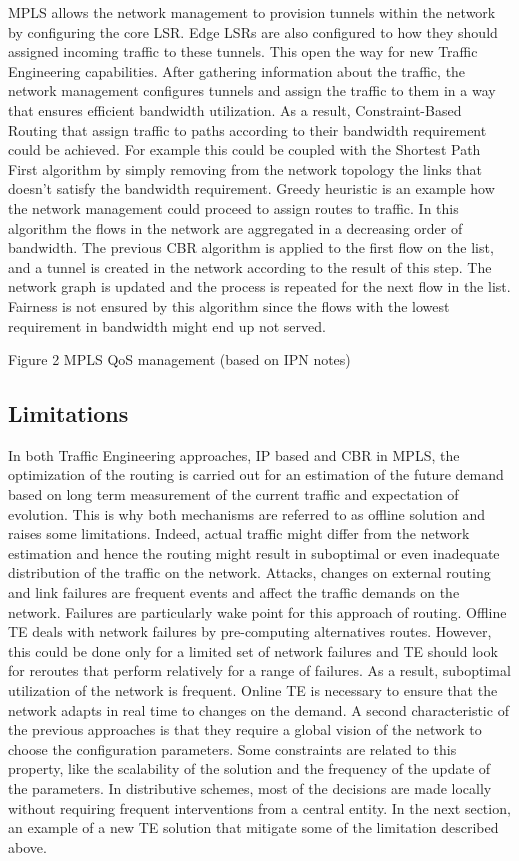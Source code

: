 	MPLS allows the network management to provision tunnels within the network by configuring the core LSR. Edge LSRs are also configured to how they should assigned incoming  traffic to these tunnels. This open the way for new Traffic Engineering capabilities. After gathering information about the traffic, the network management configures tunnels and assign the traffic to them in a way that ensures efficient bandwidth utilization. As a result, Constraint-Based Routing that assign traffic to paths according to their bandwidth requirement could be achieved. For example this could be coupled with the Shortest Path First algorithm by simply removing from the network topology the links that doesn't satisfy the bandwidth requirement. Greedy heuristic is an example how the network management could proceed to assign routes to traffic. In this algorithm the flows in the network are aggregated in a decreasing order of bandwidth. The previous CBR algorithm is applied to the first flow on the list, and a tunnel is created in the network according to the result of this step. The network graph is updated and the process is repeated for the next flow in the list. Fairness is not ensured by this algorithm since the flows with the lowest requirement in bandwidth might end up not served.

Figure 2 MPLS QoS management (based on IPN notes)

\subsection{Limitations}
	In both Traffic Engineering approaches, IP based and CBR in MPLS, the optimization of the routing is carried out for an estimation of the future demand based on long term measurement of the current traffic and expectation of evolution.  This is why both mechanisms are referred to as offline solution and raises some limitations. Indeed, actual traffic might differ from the network estimation and hence the routing might result in suboptimal or even inadequate distribution of the traffic on the network. Attacks, changes on external routing and link failures are frequent events and affect the traffic demands on the network. Failures are particularly wake point for this approach of routing. Offline TE deals with network failures by pre-computing alternatives routes. However, this could be done only for a limited set of network failures and TE should look for reroutes that perform relatively for a range of failures. As a result, suboptimal utilization of the network is frequent. Online TE is necessary to ensure that the network adapts in real time to changes on the demand.
A second characteristic of the previous approaches is that they require a global vision of the network to choose the configuration parameters. Some constraints are related to this property, like the scalability of the solution and the frequency of the update of the parameters. In distributive schemes, most of the decisions are made locally without requiring frequent interventions from a  central entity. 
In the next section, an example of a new TE solution that mitigate some of the limitation described above.

